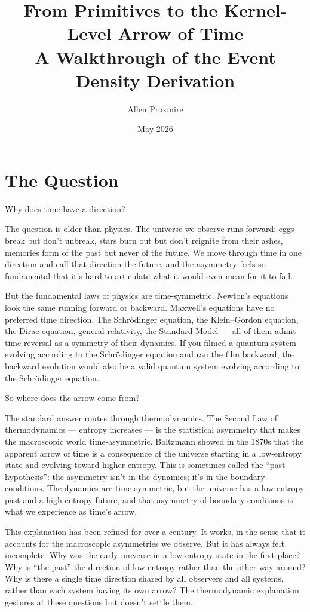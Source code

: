 \documentclass[11pt,a4paper]{article}
\title{\vspace{-1cm}\Large\bfseries From Primitives to the Kernel-Level Arrow of Time\\[6pt]
\large\mdseries A Walkthrough of the Event Density Derivation}
\author{Allen Proxmire}
\date{May 2026}
\begin{document}
\maketitle
\thispagestyle{empty}

\section{The Question}

Why does time have a direction?

The question is older than physics. The universe we observe runs forward: eggs break but don't unbreak, stars burn out but don't reignite from their ashes, memories form of the past but never of the future. We move through time in one direction and call that direction the future, and the asymmetry feels so fundamental that it's hard to articulate what it would even mean for it to fail.

But the fundamental laws of physics are time-symmetric. Newton's equations look the same running forward or backward. Maxwell's equations have no preferred time direction. The Schr\"odinger equation, the Klein--Gordon equation, the Dirac equation, general relativity, the Standard Model --- all of them admit time-reversal as a symmetry of their dynamics. If you filmed a quantum system evolving according to the Schr\"odinger equation and ran the film backward, the backward evolution would also be a valid quantum system evolving according to the Schr\"odinger equation.

So where does the arrow come from?

The standard answer routes through thermodynamics. The Second Law of thermodynamics --- entropy increases --- is the statistical asymmetry that makes the macroscopic world time-asymmetric. Boltzmann showed in the 1870s that the apparent arrow of time is a consequence of the universe starting in a low-entropy state and evolving toward higher entropy. This is sometimes called the ``past hypothesis'': the asymmetry isn't in the dynamics; it's in the boundary conditions. The dynamics are time-symmetric, but the universe has a low-entropy past and a high-entropy future, and that asymmetry of boundary conditions is what we experience as time's arrow.

This explanation has been refined for over a century. It works, in the sense that it accounts for the macroscopic asymmetries we observe. But it has always felt incomplete. Why was the early universe in a low-entropy state in the first place? Why is ``the past'' the direction of low entropy rather than the other way around? Why is there a single time direction shared by all observers and all systems, rather than each system having its own arrow? The thermodynamic explanation gestures at these questions but doesn't settle them.
\end{document}

